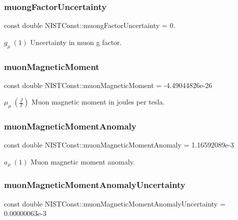 \subsubsection{\texorpdfstring{muong\+Factor\+Uncertainty}{muongFactorUncertainty}}
{\footnotesize\ttfamily const double N\+I\+S\+T\+Const\+::muong\+Factor\+Uncertainty = 0.}

$g_\mu \ (1)$ Uncertainty in muon g factor. \mbox{\label{group___muon_gacd182505756807ab247465449d821110}} 
\subsubsection{\texorpdfstring{muon\+Magnetic\+Moment}{muonMagneticMoment}}
{\footnotesize\ttfamily const double N\+I\+S\+T\+Const\+::muon\+Magnetic\+Moment = -\/4.\+49044826e-\/26}

$\mu_\mu \ (\frac{J}{T})$ Muon magnetic moment in joules per tesla. \mbox{\label{group___muon_ga555a2705f41a9f392e90147c58ae7527}} 
\subsubsection{\texorpdfstring{muon\+Magnetic\+Moment\+Anomaly}{muonMagneticMomentAnomaly}}
{\footnotesize\ttfamily const double N\+I\+S\+T\+Const\+::muon\+Magnetic\+Moment\+Anomaly = 1.\+16592089e-\/3}

$a_\mu \ (1)$ Muon magnetic moment anomaly. \mbox{\label{group___muon_ga91c2a0c6a14a87fb189ce001120b5eb0}} 
\subsubsection{\texorpdfstring{muon\+Magnetic\+Moment\+Anomaly\+Uncertainty}{muonMagneticMomentAnomalyUncertainty}}
{\footnotesize\ttfamily const double N\+I\+S\+T\+Const\+::muon\+Magnetic\+Moment\+Anomaly\+Uncertainty = 0.\+00000063e-\/3}

